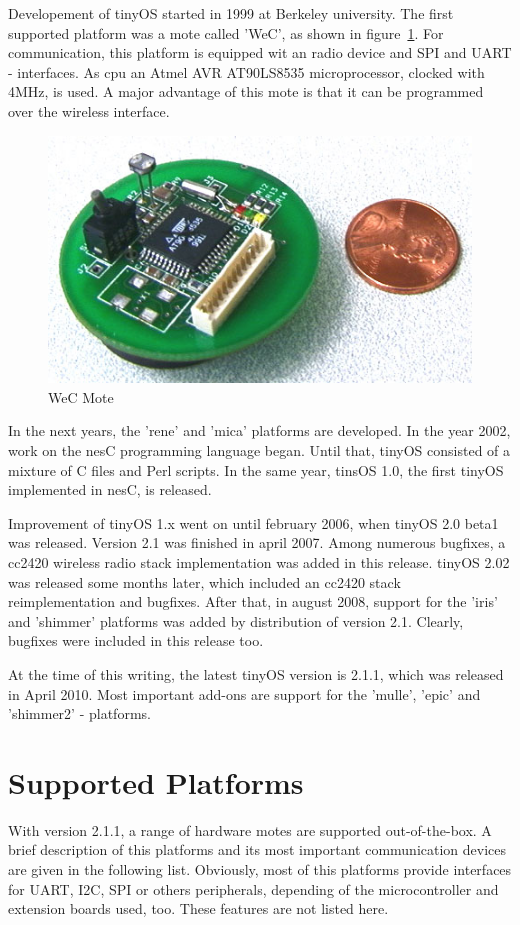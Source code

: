 Developement of tinyOS started in 1999 at Berkeley university. The first supported platform was a mote 
called 'WeC', as shown in figure~\ref{fig:WeC}. For communication, this platform is equipped wit an radio device and SPI and UART - interfaces. As cpu an Atmel AVR AT90LS8535 microprocessor, clocked with 4MHz, is used. A major advantage of this mote is that it can be programmed over the wireless interface.
\begin{figure}[h]
 \centerline{\includegraphics[width=.5\columnwidth]{pics/WeC.png}}
  \caption{WeC Mote}
  \label{fig:WeC}
\end{figure}

In the next years, the 'rene' and 'mica' platforms are developed. In the year 2002, work on the nesC programming language began. Until that, tinyOS consisted of a mixture of C files and Perl scripts. In the same year, tinsOS 1.0, the first tinyOS implemented in nesC, is released. 

Improvement of tinyOS 1.x went on until february 2006, when tinyOS 2.0 beta1 was released. Version 2.1 was finished in april 2007. Among numerous bugfixes, a cc2420 wireless radio stack implementation was added in this release. tinyOS 2.02 was released some months later, which included an cc2420 stack reimplementation and bugfixes.
After that, in august 2008, support for the 'iris' and 'shimmer' platforms was added by distribution of version 2.1. Clearly, bugfixes were included in this release too.

At the time of this writing, the latest tinyOS version is 2.1.1, which was released in April 2010. Most important add-ons are support for the 'mulle', 'epic' and 'shimmer2' - platforms. 

\section{Supported Platforms}

With version 2.1.1, a range of hardware motes are supported out-of-the-box. A brief description of this platforms and its most important communication devices are given in the following list. Obviously, most of this platforms provide interfaces for UART, I2C, SPI or others peripherals, depending of the microcontroller and extension boards used, too. These features are not listed here.

